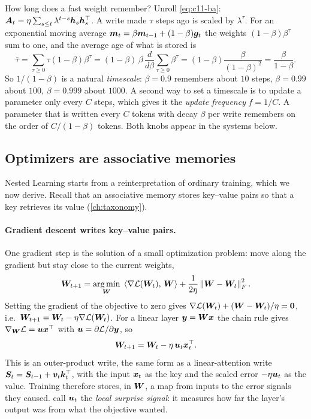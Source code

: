 How long does a fast weight remember? Unroll \cref{eq:c11-ba}:
$\bm{A}_t = \eta\sum_{s\le t}\lambda^{t-s}\bm{h}_s\bm{h}_s^{\top}$. A write made $\tau$ steps ago is scaled by
$\lambda^\tau$. For an exponential moving average $\bm{m}_t = \beta\bm{m}_{t-1} + (1-\beta)\bm{g}_t$ the
weights $(1-\beta)\beta^\tau$ sum to one, and the average age of what is stored is
\begin{equation}
  \bar\tau = \sum_{\tau\ge0}\tau(1-\beta)\beta^\tau
  = (1-\beta)\,\beta\,\frac{d}{d\beta}\sum_{\tau\ge0}\beta^\tau
  = (1-\beta)\frac{\beta}{(1-\beta)^2} = \frac{\beta}{1-\beta}.
  \label{eq:c11-horizon}
\end{equation}
So $1/(1-\beta)$ is a natural \emph{timescale}: $\beta = 0.9$ remembers about $10$ steps,
$\beta = 0.99$ about $100$, $\beta = 0.999$ about $1000$. A second way to set a timescale is to
update a parameter only every $C$ steps, which gives it the \emph{update frequency}
$f = 1/C$. A parameter that is written every $C$ tokens with decay $\beta$ per write remembers on
the order of $C/(1-\beta)$ tokens. Both knobs appear in the systems below.

\subsection{Optimizers are associative memories}\label{sec:c11-optmem}

Nested Learning starts from a reinterpretation of ordinary training, which we now derive. Recall
that an associative memory stores key--value pairs so that a key retrieves its value
(\cref{ch:taxonomy}).

\paragraph{Gradient descent writes key--value pairs.} One gradient step is the solution of a
small optimization problem: move along the gradient but stay close to the current weights,
\begin{equation}
  \bm{W}_{t+1} = \operatorname*{arg\,min}_{\bm{W}}\; \left\langle \nabla\mathcal{L}(\bm{W}_t),\, \bm{W}\right\rangle + \frac{1}{2\eta}\left\lVert \bm{W} - \bm{W}_t\right\rVert_F^2 .
  \label{eq:c11-gd-prox}
\end{equation}
Setting the gradient of the objective to zero gives
$\nabla\mathcal{L}(\bm{W}_t) + (\bm{W} - \bm{W}_t)/\eta = \bm{0}$, i.e.\ $\bm{W}_{t+1} = \bm{W}_t - \eta\nabla\mathcal{L}(\bm{W}_t)$.
For a linear layer $\bm{y} = \bm{W}\bm{x}$ the chain rule gives $\nabla_{\bm{W}}\mathcal{L} = \bm{u}\bm{x}^{\top}$ with
$\bm{u} = \partial\mathcal{L}/\partial\bm{y}$, so
\begin{equation}
  \bm{W}_{t+1} = \bm{W}_t - \eta\,\bm{u}_t\bm{x}_t^{\top} .
  \label{eq:c11-gd-write}
\end{equation}
This is an outer-product write, the same form as a linear-attention write $\bm{S}_t = \bm{S}_{t-1} +
\bm{v}_t\bm{k}_t^{\top}$, with the input $\bm{x}_t$ as the key and the scaled error $-\eta\bm{u}_t$ as the value.
Training therefore stores, in $\bm{W}$, a map from inputs to the error signals they caused.
\citet{behrouz2025nested} call $\bm{u}_t$ the \emph{local surprise signal}: it measures how far the
layer's output was from what the objective wanted.

